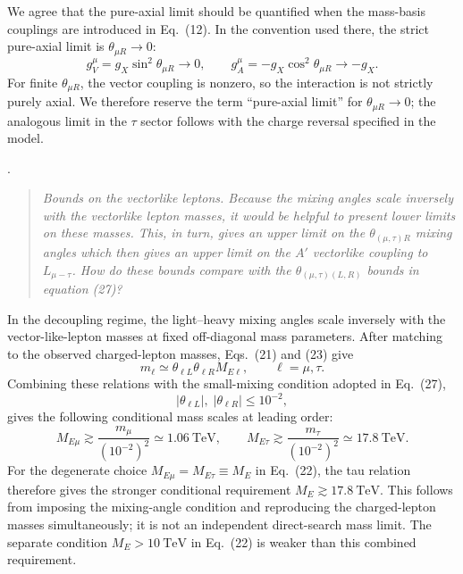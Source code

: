 \documentclass[12pt,a4paper]{article}
\begin{document}

We agree that the pure-axial limit should be quantified when the mass-basis couplings are introduced in Eq.~(12). In the convention used there, the strict pure-axial limit is \(\theta_{\mu R}\to0\):
\[
g_V^\mu=g_X\sin^2\theta_{\mu R}\to0,
\qquad
g_A^\mu=-g_X\cos^2\theta_{\mu R}\to-g_X.
\]
For finite \(\theta_{\mu R}\), the vector coupling is nonzero, so the interaction is not strictly purely axial. We therefore reserve the term ``pure-axial limit'' for \(\theta_{\mu R}\to0\); the analogous limit in the \(\tau\) sector follows with the charge reversal specified in the model.

\medskip
{}.
\begin{quote}\itshape
Bounds on the vectorlike leptons. Because the mixing angles scale inversely with the vectorlike lepton masses, it would be helpful to present lower limits on these masses. This, in turn, gives an upper limit on the \(\theta_{(\mu,\tau)R}\) mixing angles which then gives an upper limit on the \(A'\) vectorlike coupling to \(L_{\mu-\tau}\). How do these bounds compare with the \(\theta_{(\mu,\tau)(L,R)}\) bounds in equation (27)?
\end{quote}


In the decoupling regime, the light--heavy mixing angles scale inversely with the vector-like-lepton masses at fixed off-diagonal mass parameters. After matching to the observed charged-lepton masses, Eqs.~(21) and (23) give
\[
m_\ell\simeq\theta_{\ell L}\theta_{\ell R}M_{E\ell},
\qquad \ell=\mu,\tau.
\]
Combining these relations with the small-mixing condition adopted in Eq.~(27),
\[
|\theta_{\ell L}|,\;|\theta_{\ell R}|\leq10^{-2},
\]
gives the following conditional mass scales at leading order:
\[
M_{E\mu}\gtrsim\frac{m_\mu}{(10^{-2})^2}\simeq1.06~\mathrm{TeV},
\qquad
M_{E\tau}\gtrsim\frac{m_\tau}{(10^{-2})^2}\simeq17.8~\mathrm{TeV}.
\]
For the degenerate choice \(M_{E\mu}=M_{E\tau}\equiv M_E\) in Eq.~(22), the tau relation therefore gives the stronger conditional requirement \(M_E\gtrsim17.8~\mathrm{TeV}\). This follows from imposing the mixing-angle condition and reproducing the charged-lepton masses simultaneously; it is not an independent direct-search mass limit. The separate condition \(M_E>10~\mathrm{TeV}\) in Eq.~(22) is weaker than this combined requirement.
\end{document}
